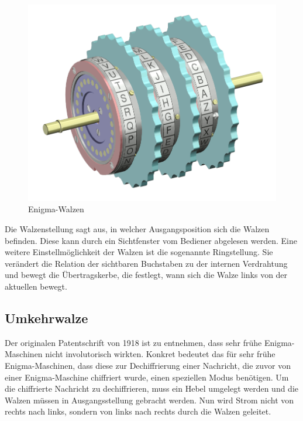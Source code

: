 \begin{figure}[htbp]
	\centering
	\includegraphics[width=.4\linewidth]{Enigma/Enigma-rotor-set}
	\caption{Enigma-Walzen\autocite{enigmarotorset2004}}
	\label{fig:enigma_rotors}
\end{figure}

Die Walzenstellung sagt aus, in welcher Ausgangsposition sich die Walzen befinden.
Diese kann durch ein Sichtfenster vom Bediener abgelesen werden.
Eine weitere Einstellmöglichkeit der Walzen ist die sogenannte Ringstellung.
Sie verändert die Relation der sichtbaren Buchstaben zu der internen Verdrahtung und bewegt die Übertragskerbe, %
die festlegt, wann sich die Walze links von der aktuellen bewegt.


\newpage
\subsection{Umkehrwalze}\label{subsec:umkehrwalze}
Der originalen Patentschrift\autocite{scherbiuschiffriermaschine1925} von 1918 ist zu entnehmen, dass sehr frühe Enigma-Maschinen nicht involutorisch wirkten.
Konkret bedeutet das für sehr frühe Enigma-Maschinen, dass diese zur Dechiffrierung einer Nachricht, die zuvor von einer Enigma-Maschine chiffriert wurde, einen speziellen Modus benötigen.
Um die chiffrierte Nachricht zu dechiffrieren, muss ein Hebel umgelegt werden und die Walzen müssen in Ausgangsstellung gebracht werden.
Nun wird Strom nicht von rechts nach links, sondern von links nach rechts durch die Walzen geleitet.

